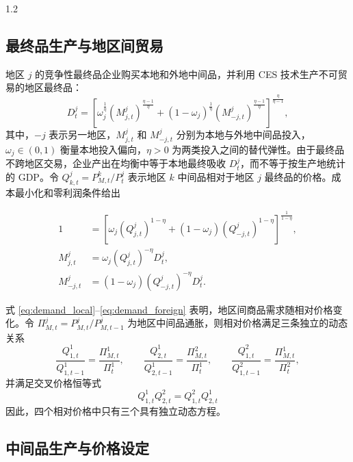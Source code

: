 \documentclass[12pt,UTF8]{ctexart}
\begin{document}
\begin{spacing}{1.2}
		\subsection{最终品生产与地区间贸易}
		
		地区 $j$ 的竞争性最终品企业购买本地和外地中间品，并利用 CES 技术生产不可贸易的地区最终品：
		\begin{equation}
			D_t^j=
			\left[
			\omega_j^{\frac{1}{\eta}}(M_{j,t}^j)^{\frac{\eta-1}{\eta}}
			+(1-\omega_j)^{\frac{1}{\eta}}(M_{-j,t}^j)^{\frac{\eta-1}{\eta}}
			\right]^{\frac{\eta}{\eta-1}},
			\label{eq:final_production}
		\end{equation}
		其中，$-j$ 表示另一地区，$M_{j,t}^j$ 和 $M_{-j,t}^j$ 分别为本地与外地中间品投入，$\omega_j\in(0,1)$ 衡量本地投入偏向，$\eta>0$ 为两类投入之间的替代弹性。由于最终品不跨地区交易，企业产出在均衡中等于本地最终吸收 $D_t^j$，而不等于按生产地统计的 GDP。令 $Q_{k,t}^j=P_{M,t}^k/P_t^j$ 表示地区 $k$ 中间品相对于地区 $j$ 最终品的价格。成本最小化和零利润条件给出
		
		\begin{align}
			1 &=\left[
			\omega_j(Q_{j,t}^j)^{1-\eta}
			+(1-\omega_j)(Q_{-j,t}^j)^{1-\eta}
			\right]^{\frac{1}{1-\eta}}, \label{eq:final_price_index}\\
			M_{j,t}^j &=\omega_j(Q_{j,t}^j)^{-\eta}D_t^j, \label{eq:demand_local}\\
			M_{-j,t}^j &=(1-\omega_j)(Q_{-j,t}^j)^{-\eta}D_t^j.
			\label{eq:demand_foreign}
		\end{align}
		
		式 \eqref{eq:demand_local}--\eqref{eq:demand_foreign} 表明，地区间商品需求随相对价格变化。令 $\Pi_{M,t}^j=P_{M,t}^j/P_{M,t-1}^j$ 为地区中间品通胀，则相对价格满足三条独立的动态关系
		\begin{equation}
			\frac{Q_{1,t}^1}{Q_{1,t-1}^1}=\frac{\Pi_{M,t}^1}{\Pi_t^1},\qquad
			\frac{Q_{2,t}^1}{Q_{2,t-1}^1}=\frac{\Pi_{M,t}^2}{\Pi_t^1},\qquad
			\frac{Q_{1,t}^2}{Q_{1,t-1}^2}=\frac{\Pi_{M,t}^1}{\Pi_t^2},
			\label{eq:q_dynamics_independent}
		\end{equation}
		并满足交叉价格恒等式
		\begin{equation}
			Q_{1,t}^1Q_{2,t}^2=Q_{1,t}^2Q_{2,t}^1
			\label{eq:q_identity}
		\end{equation}
		因此，四个相对价格中只有三个具有独立动态方程。
		
		\subsection{中间品生产与价格设定}
		

\end{spacing}
\end{document}
